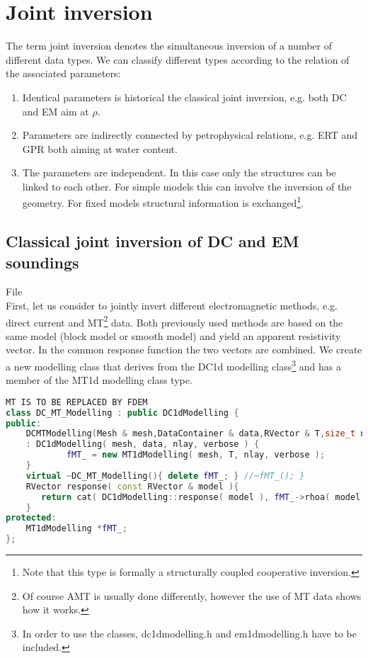 \section{Joint inversion}\label{sec:joint}
The term joint inversion denotes the simultaneous inversion of a number of different data types.
We can classify different types according to the relation of the associated parameters:
\begin{enumerate}
	\item Identical parameters is historical the classical joint inversion, e.g. both DC and EM aim at $\rho$.
	\item Parameters are indirectly connected by petrophysical relations, e.g. ERT and GPR both aiming at water content.
	\item The parameters are independent. In this case only the structures can be linked to each other. For simple models this can involve the inversion of the geometry. For fixed models structural information is exchanged\footnote{Note that this type is formally a structurally coupled cooperative inversion.}.
\end{enumerate}

\subsection{Classical joint inversion of DC and EM soundings}\label{sec:jointdcem}
File \\
First, let us consider to jointly invert different electromagnetic methods, e.g. direct current and MT\footnote{Of course AMT is usually done differently, however the use of MT data shows how it works.} data.
Both previously used methods are based on the same model (block model or smooth model) and yield an apparent resistivity vector.
In the common response function the two vectors are combined.
We create a new modelling class that derives from the DC1d modelling class\footnote{In order to use the classes, dc1dmodelling.h and em1dmodelling.h have to be included.} and has a member of the MT1d modelling class type.

\begin{lstlisting}[language=C++,morekeywords={RVector,RMatrix}]
MT IS TO BE REPLACED BY FDEM
class DC_MT_Modelling : public DC1dModelling {
public:
    DCMTModelling(Mesh & mesh,DataContainer & data,RVector & T,size_t nlay)
    : DC1dModelling( mesh, data, nlay, verbose ) { 
            fMT_ = new MT1dModelling( mesh, T, nlay, verbose );
    }
    virtual ~DC_MT_Modelling(){ delete fMT_; } //~fMT_(); }
    RVector response( const RVector & model ){
       return cat( DC1dModelling::response( model ), fMT_->rhoa( model ) );
    }
protected:
    MT1dModelling *fMT_;
};
\end{lstlisting}

